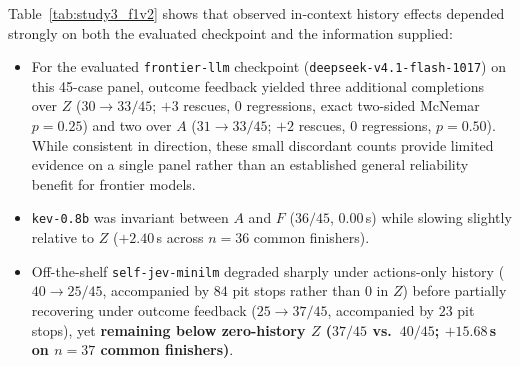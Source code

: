 \documentclass[11pt,a4paper]{article}
\begin{document}
\begin{table}[t]
\centering
\caption{Study~3: In-context adaptation without weight updates on \texttt{seed\_B} (\texttt{2001..2005}, $N=45$). \texttt{self-jev-minilm} is the UI display label for off-the-shelf \nolinkurl{cross-encoder/ms-marco-MiniLM-L6-v2} (not fine-tuned for this project).}
\label{tab:study3_f1v2}
\end{table}

Table~\ref{tab:study3_f1v2} shows that observed in-context history effects depended strongly on both the evaluated checkpoint and the information supplied:
\begin{itemize}[leftmargin=1.5em,itemsep=2pt]
  \item For the evaluated \texttt{frontier-llm} checkpoint (\texttt{deepseek-v4.1-flash-1017}) on this 45-case panel, outcome feedback yielded three additional completions over $Z$ ($30 \rightarrow 33/45$; $+3$ rescues, $0$ regressions, exact two-sided McNemar $p = 0.25$) and two over $A$ ($31 \rightarrow 33/45$; $+2$ rescues, $0$ regressions, $p = 0.50$). While consistent in direction, these small discordant counts provide limited evidence on a single panel rather than an established general reliability benefit for frontier models.
  \item \texttt{kev-0.8b} was invariant between $A$ and $F$ ($36/45$, $0.00$\,s) while slowing slightly relative to $Z$ ($+2.40$\,s across $n=36$ common finishers).
  \item Off-the-shelf \texttt{self-jev-minilm} degraded sharply under actions-only history ($40 \rightarrow 25/45$, accompanied by $84$ pit stops rather than $0$ in $Z$) before partially recovering under outcome feedback ($25 \rightarrow 37/45$, accompanied by $23$ pit stops), yet \textbf{remaining below zero-history $Z$ ($37/45$ vs.\ $40/45$; $+15.68$\,s on $n=37$ common finishers)}.
\end{itemize}
\end{document}
